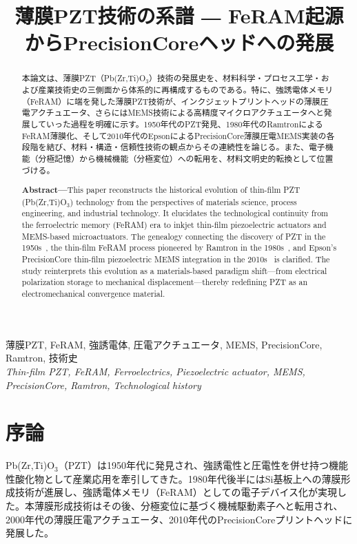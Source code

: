 \documentclass[conference]{IEEEtran}
\title{薄膜PZT技術の系譜 ― FeRAM起源からPrecisionCoreヘッドへの発展}
\author{%
  \IEEEauthorblockN{三溝 真一 (Shinichi Samizo)}%
  \IEEEauthorblockA{%
    独立系半導体研究者（元セイコーエプソン）\\%
    Independent Semiconductor Researcher (ex-Seiko Epson)\\[2pt]%
    Email:~\href{mailto:shin3t72@gmail.com}{shin3t72@gmail.com}\quad
    GitHub:~\url{https://github.com/Samizo-AITL}%
  }%
}
\date{}
\begin{document}
\maketitle

\begin{abstract}
本論文は、薄膜PZT（Pb(Zr,Ti)O$_3$）技術の発展史を、材料科学・プロセス工学・および産業技術史の三側面から体系的に再構成するものである。特に、強誘電体メモリ（FeRAM）に端を発した薄膜PZT技術が、インクジェットプリントヘッドの薄膜圧電アクチュエータ、さらにはMEMS技術による高精度マイクロアクチュエータへと発展していった過程を明確に示す。1950年代のPZT発見\cite{jaffe1954}、1980年代のRamtronによるFeRAM薄膜化\cite{ramtron_iedm1989,scott2000review}、そして2010年代のEpsonによるPrecisionCore薄膜圧電MEMS実装\cite{uemura2014mems}の各段階を結び、材料・構造・信頼性技術の観点からその連続性を論じる。また、電子機能（分極記憶）から機械機能（分極変位）への転用を、材料文明史的転換として位置づける。

\medskip
\textbf{Abstract—}This paper reconstructs the historical evolution of thin-film PZT (Pb(Zr,Ti)O$_3$) technology from the perspectives of materials science, process engineering, and industrial technology. It elucidates the technological continuity from the ferroelectric memory (FeRAM) era to inkjet thin-film piezoelectric actuators and MEMS-based microactuators. The genealogy connecting the discovery of PZT in the 1950s~\cite{jaffe1954}, the thin-film FeRAM process pioneered by Ramtron in the 1980s~\cite{ramtron_iedm1989,scott2000review}, and Epson’s PrecisionCore thin-film piezoelectric MEMS integration in the 2010s~\cite{uemura2014mems} is clarified. The study reinterprets this evolution as a materials-based paradigm shift—from electrical polarization storage to mechanical displacement—thereby redefining PZT as an electromechanical convergence material.
\end{abstract}

\begin{IEEEkeywords}
薄膜PZT, FeRAM, 強誘電体, 圧電アクチュエータ, MEMS, PrecisionCore, Ramtron, 技術史\\
\textit{Thin-film PZT, FeRAM, Ferroelectrics, Piezoelectric actuator, MEMS, PrecisionCore, Ramtron, Technological history}
\end{IEEEkeywords}

\section{序論}
Pb(Zr,Ti)O$_3$（PZT）は1950年代に発見され\cite{jaffe1954}、強誘電性と圧電性を併せ持つ機能性酸化物として産業応用を牽引してきた。1980年代後半にはSi基板上への薄膜形成技術が進展し、強誘電体メモリ（FeRAM）としての電子デバイス化が実現した\cite{ramtron_iedm1989}。本薄膜形成技術はその後、分極変位に基づく機械駆動素子へと転用され、2000年代の薄膜圧電アクチュエータ、2010年代のPrecisionCoreプリントヘッドに発展した\cite{uemura2014mems,epson_wp_precisioncore}。
\end{document}
